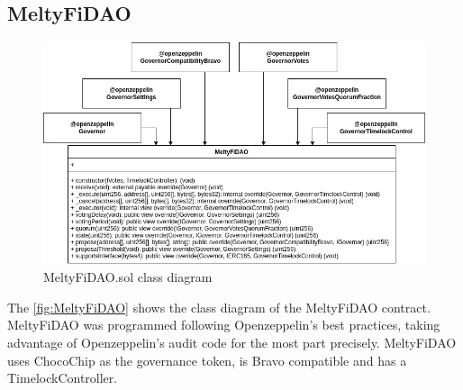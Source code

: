 \subsection{MeltyFiDAO}
\begin{figure}[h]
    \centering
    \includegraphics[width=\textwidth]{figures/MeltyFiDAO_class_diagram.png}
    \caption{MeltyFiDAO.sol class diagram}
    \label{fig:MeltyFiDAO}
\end{figure}
The \autoref{fig:MeltyFiDAO} shows the class diagram of the MeltyFiDAO contract. MeltyFiDAO was programmed following Openzeppelin's best practices, taking advantage of Openzeppelin's audit code for the most part precisely. MeltyFiDAO uses ChocoChip as the governance token, is Bravo compatible and has a TimelockController.

